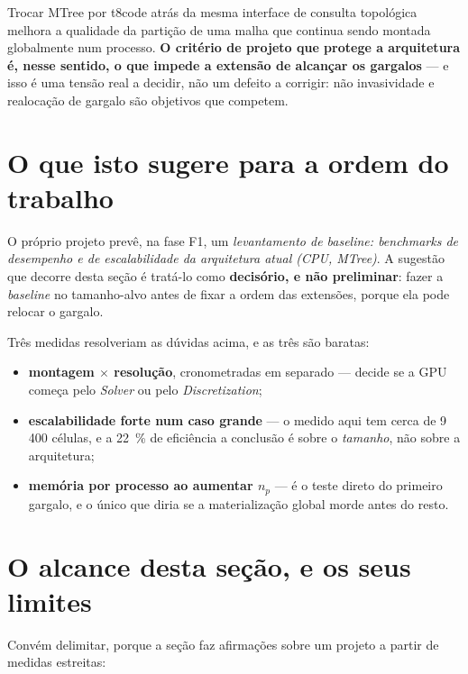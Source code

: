 Trocar MTree por t8code atr\'as da mesma interface de consulta topol\'ogica
melhora a qualidade da parti\c{c}\~ao de uma malha que continua sendo montada
globalmente num processo. \textbf{O crit\'erio de projeto que protege a
arquitetura \'e, nesse sentido, o que impede a extens\~ao de alcan\c{c}ar os
gargalos} --- e isso \'e uma tens\~ao real a decidir, n\~ao um defeito a corrigir:
n\~ao invasividade e realoca\c{c}\~ao de gargalo s\~ao objetivos que competem.

\section{O que isto sugere para a ordem do trabalho}

O pr\'oprio projeto prev\^e, na fase F1, um \emph{levantamento de
\emph{baseline}: \emph{benchmarks} de desempenho e de escalabilidade da
arquitetura atual (CPU, MTree)}. A sugest\~ao que decorre desta se\c{c}\~ao \'e
trat\'a-lo como \textbf{decis\'orio, e n\~ao preliminar}: fazer a
\emph{baseline} no tamanho-alvo antes de fixar a ordem das extens\~oes, porque
ela pode relocar o gargalo.

Tr\^es medidas resolveriam as d\'uvidas acima, e as tr\^es s\~ao baratas:

\begin{itemize}
  \item \textbf{montagem $\times$ resolu\c{c}\~ao}, cronometradas em separado ---
    decide se a GPU come\c{c}a pelo \emph{Solver} ou pelo \emph{Discretization};
  \item \textbf{escalabilidade forte num caso grande} --- o medido aqui tem cerca
    de 9\,400 c\'elulas, e a \SI{22}{\percent} de efici\^encia a conclus\~ao \'e
    sobre o \emph{tamanho}, n\~ao sobre a arquitetura;
  \item \textbf{mem\'oria por processo ao aumentar $n_p$} --- \'e o teste direto do
    primeiro gargalo, e o \'unico que diria se a materializa\c{c}\~ao global morde
    antes do resto.
\end{itemize}

\section{O alcance desta se\c{c}\~ao, e os seus limites}

Convém delimitar, porque a se\c{c}\~ao faz afirma\c{c}\~oes sobre um projeto a
partir de medidas estreitas:

